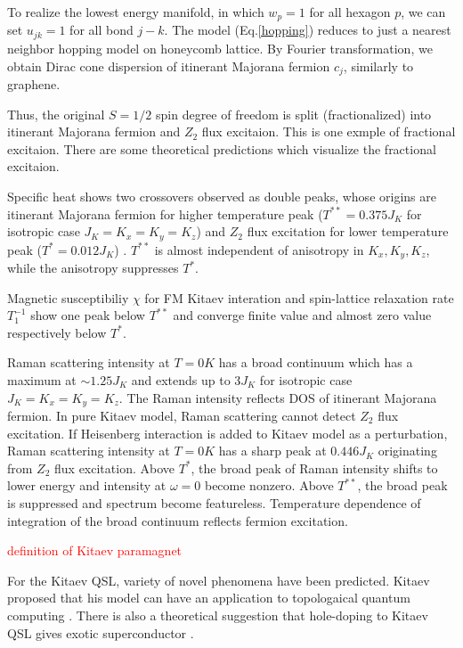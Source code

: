 To realize the lowest energy manifold, in which $w_p = 1$ for all hexagon $p$, we can set $u_{jk} = 1$ for all bond $j-k$.
The model (Eq.\ref{hopping}) reduces to just a nearest neighbor hopping model on honeycomb lattice.
By Fourier transformation, we obtain Dirac cone dispersion of itinerant Majorana fermion $c_j$, similarly to graphene.

Thus, the original $S = 1/2$ spin degree of freedom is split (fractionalized) into itinerant Majorana fermion and $Z_2$ flux excitaion.
This is one exmple of fractional excitaion.
There are some theoretical predictions which visualize the fractional excitaion.

Specific heat shows two crossovers observed as double peaks, whose origins are itinerant Majorana fermion for higher temperature peak ($T^{**} = 0.375J_K$ for isotropic case $J_K = K_x = K_y = K_z$) and $Z_2$ flux excitation for lower temperature peak ($T^* = 0.012J_K$) \cite{nasu2015thermal,}.
$T^{**}$ is almost independent of anisotropy in $K_x, K_y, K_z$, while the anisotropy suppresses $T^*$.

Magnetic susceptibiliy $\chi$ for FM Kitaev interation and spin-lattice relaxation rate $T^{-1}_1$ show one peak below $T^{**}$ and converge finite value and almost zero value respectively below $T^*$.

Raman scattering intensity at $T = 0 K$ has a broad continuum which has a maximum at $\sim 1.25J_K$ and extends up to $3J_K$ for isotropic case $J_K = K_x = K_y = K_z$.
The Raman intensity reflects DOS of itinerant Majorana fermion.
In pure Kitaev model, Raman scattering cannot detect $Z_2$ flux excitation.
If Heisenberg interaction is added to Kitaev model as a perturbation, Raman scattering intensity at $T = 0 K$ has a sharp peak at $0.446J_K$ originating from $Z_2$ flux excitation.
Above $T^*$, the broad peak of Raman intensity shifts to lower energy and intensity at $\omega = 0$ become nonzero.
Above $T^{**}$, the broad peak is suppressed and spectrum become featureless.
Temperature dependence of integration of the broad continuum reflects fermion excitation.

\textcolor{red}{definition of Kitaev paramagnet}

\begin{comment}
In the case of $K_x > |K_y + K_z|$ or $K_y > |K_z + K_x|$ or $K_z > |K_x + K_y|$, the Dirac cone become gapped out.
Especially, in the limit of $K_x \gg |K_y + K_z|$ or $K_y \gg |K_z + K_x|$ or $K_z \gg |K_x + K_y|$, the spin model Eq.(\ref{Kitaev_H}) reduces to toric code model, where excitation become Abelian anyon.
On the other hand, in the case of $K_x \leq |K_y + K_z|$ and $K_y \leq |K_z + K_x|$ and $K_z \leq |K_x + K_y|$, the Dirac cone is gapless but become gapped if external magnetic field along (111) derection is applied.
The excitation in the field-induced gapped phase is non-Abelian anyon, which is key ingrediant for topological quantum computing.
\end{comment}
For the Kitaev QSL, variety of novel phenomena have been predicted. Kitaev proposed that his model can have an application to topologaical quantum computing \cite{kitaev2006anyons}.
There is also a theoretical suggestion that hole-doping to Kitaev QSL gives exotic superconductor \cite{you2012doping}.

